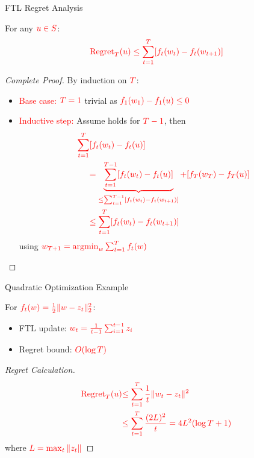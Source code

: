 \documentclass{beamer}
\begin{document}
\begin{frame}{FTL Regret Analysis}
\begin{theorem}[Lemma 2.1]
For any $\textcolor{red}{u \in S}$:
\[
\textcolor{red}{\text{Regret}_T(u) \leq \sum_{t=1}^T [f_t(w_t) - f_t(w_{t+1})]}
\]
\end{theorem}

\begin{proof}[Complete Proof]
By induction on $\textcolor{red}{T}$:
\begin{itemize}
\item \textcolor{red}{Base case:} $\textcolor{red}{T=1}$ trivial as $\textcolor{red}{f_1(w_1) - f_1(u) \leq 0}$

\item \textcolor{red}{Inductive step:} Assume holds for $\textcolor{red}{T-1}$, then
\begin{align*}
\textcolor{red}{\sum_{t=1}^T} &\textcolor{red}{[f_t(w_t) - f_t(u)]} \\
&\textcolor{red}{= \underbrace{\sum_{t=1}^{T-1} [f_t(w_t) - f_t(u)]}_{\leq \sum_{t=1}^{T-1} [f_t(w_t) - f_t(w_{t+1})]} + [f_T(w_T) - f_T(u)]} \\
&\textcolor{red}{\leq \sum_{t=1}^T [f_t(w_t) - f_t(w_{t+1})]}
\end{align*}
using $\textcolor{red}{w_{T+1} = \operatorname{argmin}_w \sum_{t=1}^T f_t(w)}$
\end{itemize}
\end{proof}
\end{frame}

\begin{frame}{Quadratic Optimization Example}
\begin{example}
For $\textcolor{red}{f_t(w) = \frac{1}{2}\|w - z_t\|_2^2}$:
\begin{itemize}
\item FTL update: $\textcolor{red}{w_t = \frac{1}{t-1}\sum_{i=1}^{t-1} z_i}$
\item Regret bound: $\textcolor{red}{O(\log T)}$
\end{itemize}
\end{example}

\begin{proof}[Regret Calculation]
\begin{align*}
\textcolor{red}{\text{Regret}_T(u)} &\textcolor{red}{\leq \sum_{t=1}^T \frac{1}{t} \|w_t - z_t\|^2} \\
&\textcolor{red}{\leq \sum_{t=1}^T \frac{(2L)^2}{t} = 4L^2(\log T + 1)}
\end{align*}
where $\textcolor{red}{L = \max_t \|z_t\|}$
\end{proof}
\end{frame}
\end{document}
